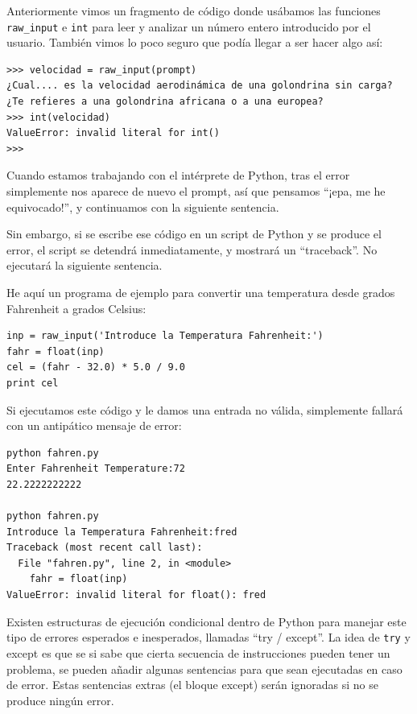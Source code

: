 Anteriormente vimos un fragmento de código donde usábamos las funciones \verb"raw_input" e
{\tt int} para leer y analizar un número entero introducido por
el usuario. También vimos lo poco seguro que podía llegar a ser hacer algo así:

\beforeverb
\begin{verbatim}
>>> velocidad = raw_input(prompt)
¿Cual.... es la velocidad aerodinámica de una golondrina sin carga?
¿Te refieres a una golondrina africana o a una europea?
>>> int(velocidad)
ValueError: invalid literal for int()
>>>
\end{verbatim}
\afterverb
%
Cuando estamos trabajando con el intérprete de Python, tras el error simplemente
nos aparece de nuevo el prompt, así que pensamos ``¡epa, me he equivocado!'', y continuamos
con la siguiente sentencia.

Sin embargo, si se escribe ese código en un
script de Python y se produce el error, el script se detendrá
inmediatamente, y mostrará un ``traceback''.
No ejecutará la siguiente sentencia.


He aquí un programa de ejemplo para convertir una temperatura
desde grados Fahrenheit a grados Celsius:


\beforeverb
\begin{verbatim}
inp = raw_input('Introduce la Temperatura Fahrenheit:')
fahr = float(inp)
cel = (fahr - 32.0) * 5.0 / 9.0
print cel
\end{verbatim}
\afterverb
%
Si ejecutamos este código y le damos una entrada no válida, simplemente
fallará con un antipático mensaje de error:

\beforeverb
\begin{verbatim}
python fahren.py 
Enter Fahrenheit Temperature:72
22.2222222222

python fahren.py 
Introduce la Temperatura Fahrenheit:fred
Traceback (most recent call last):
  File "fahren.py", line 2, in <module>
    fahr = float(inp)
ValueError: invalid literal for float(): fred
\end{verbatim}
\afterverb
%
Existen estructuras de ejecución condicional dentro de
Python para manejar este tipo de errores esperados e
inesperados, llamadas ``try / except''. La idea de {\tt try}
y {\\ except} es que se si sabe que cierta secuencia
de instrucciones pueden tener un problema, se pueden
añadir algunas sentencias para que sean ejecutadas en caso de error.
Estas sentencias extras (el bloque except) serán ignoradas
si no se produce ningún error.

